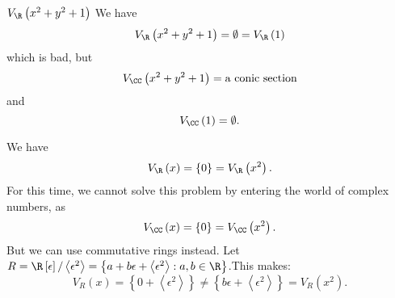 \documentclass[co439]{subfiles}
\begin{document}
    \begin{example}{$V_{\R}\left( x^{2}+y^{2}+1 \right)$}
        We have
        \begin{equation*}
            V_{\R}\left( x^{2}+y^{2}+1 \right) = \emptyset = V_{\R}\left( 1 \right)
        \end{equation*}
        which is bad, but
        \begin{equation*}
            V_{\CC}\left( x^{2}+y^{2}+1 \right) = \text{a conic section}
        \end{equation*}
        and
        \begin{equation*}
            V_{\CC}\left( 1 \right) = \emptyset.
        \end{equation*}
    \end{example}

    \rruleline

    \begin{example}{}
        We have
        \begin{equation*}
            V_{\R}\left( x \right) = \left\lbrace 0 \right\rbrace = V_{\R}\left( x^{2} \right).
        \end{equation*}
        For this time, we cannot solve this problem by entering the world of complex numbers, as
        \begin{equation*}
            V_{\CC}\left( x \right) = \left\lbrace 0 \right\rbrace = V_{\CC}\left( x^{2} \right).
        \end{equation*}
        But we can use commutative rings instead. Let $R = \R\left[ \epsilon \right] /\left< \epsilon^{2} \right> = \left\lbrace a+b\epsilon+\left< \epsilon^{2} \right> : a,b\in\R  \right\rbrace$.\footnotemark[1] This makes:
        \begin{equation*}
            V_R\left( x \right) = \left\lbrace 0+\left< \epsilon^{2} \right>  \right\rbrace \neq \left\lbrace b\epsilon+\left< \epsilon^{2} \right>  \right\rbrace = V_R\left( x^{2} \right).
        \end{equation*}
        
        \noindent
        \begin{minipage}{\textwidth}
        \end{minipage}
    \end{example}
\end{document}
